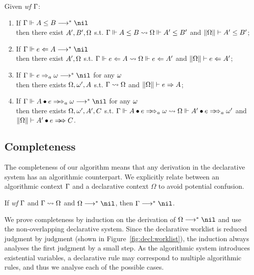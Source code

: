\begin{corollary}
Given \emph{wf }$\Gamma$:
\begin{enumerate}
    \item If $\Gm \Vdash A \le B \redto \nil$\\
        then there exist $A', B', \Omega$ s.t.
        $\Gamma \Vdash A \le B \rightsquigarrow \Omega \Vdash A' \le B'$ and $\|\Omega\| \vdash A' \le B'$;
    \item If $\Gm \Vdash e \Lto A \redto \nil$\\
        then there exist $ A', \Omega$ s.t.
        $\Gamma \Vdash e \Leftarrow A \rightsquigarrow \Omega \Vdash e \Leftarrow A'$ and $\|\Omega\| \vdash e \Leftarrow A'$;
    \item If $\Gm \Vdash e \To_a \jg \redto \nil$ for any $\omega$\\
        then there exists $\Omega, \omega', A$ s.t.
        $\Gamma \rightsquigarrow \Omega$ and $\|\Omega\| \vdash e \Rightarrow A$;
    \item If $\Gm \Vdash \appInfAlg{A}{e} \redto \nil$ for any $\omega$\\
        then there exists $\Omega, \omega', A', C$ s.t.
        $\Gm \Vdash \appInfAlg{A}{e} \sto \Om \Vdash \appInfAlg{A'}{e}[a][\jg']$
            and $\|\Om\| \vdash \appInf{A'}{e}{C}$.
\end{enumerate}
\end{corollary}

\subsection{Completeness}

The completeness of our algorithm means that any derivation in the
declarative system has an algorithmic counterpart.
We explicitly relate between an algorithmic context $\Gamma$ and
a declarative context $\Omega$ to avoid potential confusion.

\begin{theorem}[Completeness]
If \emph{wf }$\Gamma$ and $\Gamma\rightsquigarrow\Omega$ and $\Om\redto\nil$, then $\Gm \redto \nil$.
\label{thm:completeness}
\end{theorem}

We prove completeness by induction on the derivation of $\Om\redto\nil$
and use the non-overlapping declarative system.
Since the declarative worklist is reduced judgment by judgment
(shown in Figure~\ref{fig:decl:worklist}),
the induction always analyses the first judgment by a small step.
As the algorithmic system introduces existential variables,
a declarative rule may correspond to multiple algorithmic rules,
and thus we analyse each of the possible cases.

